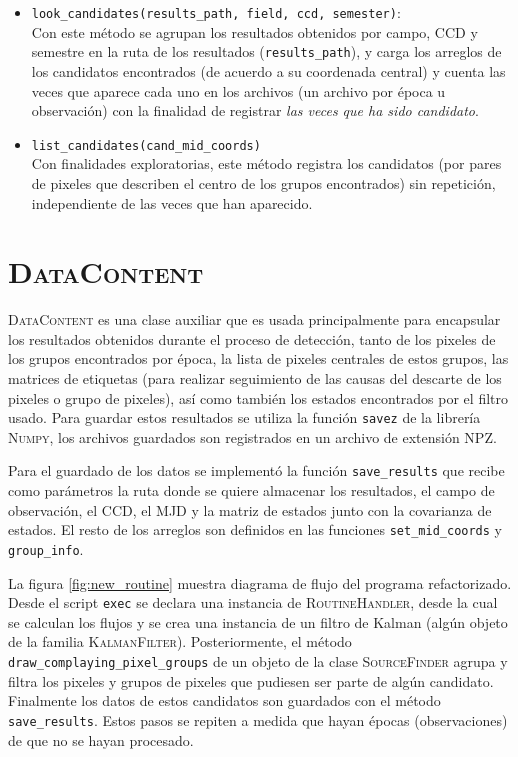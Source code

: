 \begin{itemize}
\item \texttt{look\_candidates(results\_path, field, ccd, semester)}:\\
Con este m\'etodo se agrupan los resultados obtenidos por campo, CCD y semestre en la ruta de los resultados (\texttt{results\_path}), y carga los arreglos de los candidatos encontrados (de acuerdo a su coordenada central) y cuenta las veces que aparece cada uno en los archivos (un archivo por \'epoca u observaci\'on) con la finalidad de registrar \textit{las veces que ha sido candidato}.  
\bigskip

\item \texttt{list\_candidates(cand\_mid\_coords)}\\
Con finalidades exploratorias, este m\'etodo registra los candidatos (por pares de pixeles que describen el centro de los grupos encontrados) sin repetici\'on, independiente de las veces que han aparecido.
\end{itemize}

  
\section{\textsc{DataContent}}
\textsc{DataContent} es una clase auxiliar que es usada principalmente para encapsular los resultados obtenidos durante el proceso de detecci\'on, tanto de los pixeles de los grupos encontrados por \'epoca, la lista de pixeles centrales de estos grupos, las matrices de etiquetas (para realizar seguimiento de las causas del descarte de los pixeles o grupo de pixeles), as\'i como tambi\'en los estados encontrados por el filtro usado. Para guardar estos resultados se utiliza la funci\'on \texttt{savez} de la librer\'ia \textsc{Numpy}, los archivos guardados son registrados en un archivo de extensi\'on NPZ.
\bigskip

Para el guardado de los datos se implement\'o la funci\'on \texttt{save\_results} que recibe como par\'ametros la ruta donde se quiere almacenar los resultados, el campo de observaci\'on, el CCD, el MJD y la matriz de estados junto con la covarianza de estados. El resto de los arreglos son definidos en las funciones \texttt{set\_mid\_coords} y \texttt{group\_info}.
\bigskip

La figura \ref{fig:new_routine} muestra diagrama de flujo del programa refactorizado. Desde el script \texttt{exec} se declara una instancia de \textsc{RoutineHandler}, desde la cual se calculan los flujos y se crea una instancia de un filtro de Kalman (alg\'un objeto de la familia \textsc{KalmanFilter}). Posteriormente, el m\'etodo \texttt{draw\_complaying\_pixel\_groups} de un objeto de la clase \textsc{SourceFinder} agrupa y filtra los pixeles y grupos de pixeles que pudiesen ser parte de alg\'un candidato. Finalmente los datos de estos candidatos son guardados con el m\'etodo \texttt{save\_results}. Estos pasos se repiten a medida que hayan \'epocas (observaciones) de que no se hayan procesado.    

